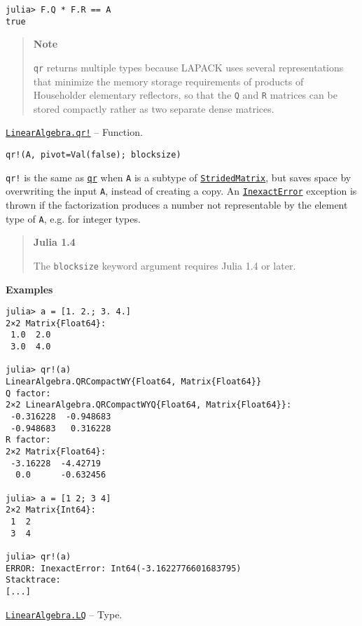 \begin{adjustwidth}{2em}{0pt}
\begin{verbatim}
julia> F.Q * F.R == A
true
\end{verbatim}

\begin{quote}
\textbf{Note}

\texttt{qr} returns multiple types because LAPACK uses several representations that minimize the memory storage requirements of products of Householder elementary reflectors, so that the \texttt{Q} and \texttt{R} matrices can be stored compactly rather as two separate dense matrices.

\end{quote}


\end{adjustwidth}
\hypertarget{9968830575998743150}{}
\hyperlink{9968830575998743150}{\texttt{LinearAlgebra.qr!}}  -- {Function.}

\begin{adjustwidth}{2em}{0pt}


\begin{verbatim}
qr!(A, pivot=Val(false); blocksize)
\end{verbatim}

\texttt{qr!} is the same as \hyperlink{4122539696772350360}{\texttt{qr}} when \texttt{A} is a subtype of \hyperlink{3855703768476610836}{\texttt{StridedMatrix}}, but saves space by overwriting the input \texttt{A}, instead of creating a copy. An \hyperlink{5399118524830636312}{\texttt{InexactError}} exception is thrown if the factorization produces a number not representable by the element type of \texttt{A}, e.g. for integer types.

\begin{quote}
\textbf{Julia 1.4}

The \texttt{blocksize} keyword argument requires Julia 1.4 or later.

\end{quote}
\textbf{Examples}


\begin{verbatim}
julia> a = [1. 2.; 3. 4.]
2×2 Matrix{Float64}:
 1.0  2.0
 3.0  4.0

julia> qr!(a)
LinearAlgebra.QRCompactWY{Float64, Matrix{Float64}}
Q factor:
2×2 LinearAlgebra.QRCompactWYQ{Float64, Matrix{Float64}}:
 -0.316228  -0.948683
 -0.948683   0.316228
R factor:
2×2 Matrix{Float64}:
 -3.16228  -4.42719
  0.0      -0.632456

julia> a = [1 2; 3 4]
2×2 Matrix{Int64}:
 1  2
 3  4

julia> qr!(a)
ERROR: InexactError: Int64(-3.1622776601683795)
Stacktrace:
[...]
\end{verbatim}



\end{adjustwidth}
\hypertarget{15372856222060015568}{}
\hyperlink{15372856222060015568}{\texttt{LinearAlgebra.LQ}}  -- {Type.}

